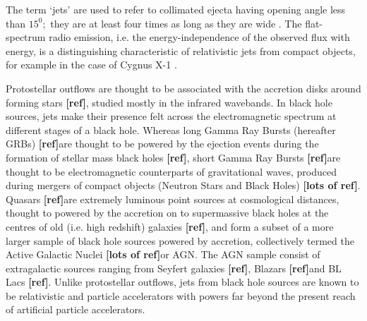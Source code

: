 \newcommand{\R}{\textbf{[ref]}}
\newcommand{\Rlots}{\textbf{[lots of ref]}}


The term `jets' are used to refer to collimated ejecta having opening angle less than $15^{0};$ they are at least four times as long as they are wide \citep{Bridle_&_Perley-1984-ARAA}. The flat-spectrum radio emission, i.e. the energy-independence of the observed flux with energy, is a distinguishing characteristic of relativistic jets from compact objects, for example in the case of Cygnus X-1 \citep{Pandey_et_al.-2007-AAp,Fender_et_al.-2000-MNRAS}.

Protostellar outflows are thought to be associated with the accretion disks around forming stars \R, studied mostly in the infrared wavebands. In black hole sources, jets make their presence felt across the electromagnetic spectrum at different stages of a black hole. Whereas long Gamma Ray Bursts (hereafter GRBs)  \R  are thought to be powered by the ejection events during the formation of stellar mass black holes \R, short Gamma Ray Bursts \R  are thought to be electromagnetic counterparts of gravitational waves, produced during mergers of compact objects (Neutron Stars and Black Holes) \Rlots. Quasars \R are extremely luminous point sources at cosmological distances, thought to powered by the accretion on to supermassive black holes at the centres of old (i.e. high redshift) galaxies \R, and form a subset of a more larger sample of black hole sources powered by accretion, collectively termed the Active Galactic Nuclei \Rlots or AGN. The AGN sample consist of extragalactic sources ranging from Seyfert galaxies \R, Blazars \R and BL Lacs \R. Unlike protostellar outflows, jets from black hole sources are known to be relativistic and particle accelerators with powers far beyond the present reach of artificial particle accelerators.

